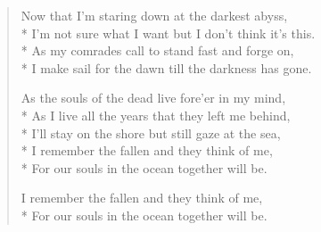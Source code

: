 \documentclass[9pt,twoside]{extarticle}
\newenvironment{xverse}{
	\begin{verse}
	\fontsize{8.5}{10.5}\selectfont
}{
	\end{verse}
}
\begin{document}
\begin{xverse}
Now that I’m staring down at the darkest abyss, \\*
I’m not sure what I want but I don’t think it’s this. \\*
As my comrades call to stand fast and forge on, \\*
I make sail for the dawn till the darkness has gone.

As the souls of the dead live fore’er in my mind, \\*
As I live all the years that they left me behind, \\*
I’ll stay on the shore but still gaze at the sea, \\*
I remember the fallen and they think of me, \\*
For our souls in the ocean together will be.

I remember the fallen and they think of me, \\*
For our souls in the ocean together will be.
\end{xverse}
\end{document}
